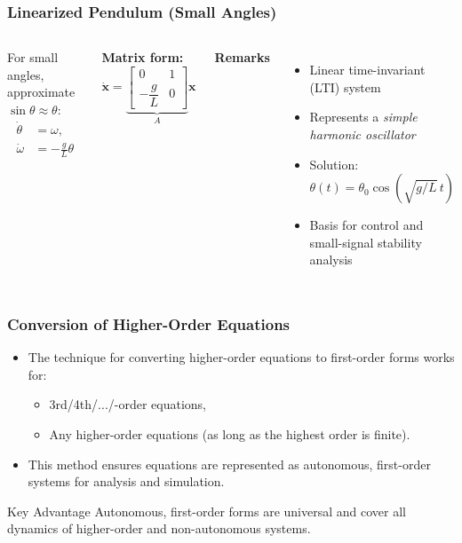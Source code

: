 \documentclass{beamer}
\begin{document}
\begin{frame}
\frametitle{Linearized Pendulum (Small Angles)}
\scriptsize

\begin{columns}[T,onlytextwidth]

  For small angles, approximate \(\sin\theta \approx \theta\):
  \[
    \begin{aligned}
      \dot{\theta} &= \omega,\\[-2pt]
      \dot{\omega} &= -\frac{g}{L}\theta
    \end{aligned}
  \]

  \textbf{Matrix form:}
  \[
    \dot{\mathbf{x}} =
    \underbrace{\begin{bmatrix}
      0 & 1\\[2pt]
      -\dfrac{g}{L} & 0
    \end{bmatrix}}_{A}
    \mathbf{x}
  \]

  \textbf{Remarks}
  \vspace{-4pt}
  \begin{itemize}\itemsep2pt
    \item Linear time-invariant (LTI) system
    \item Represents a \textit{simple harmonic oscillator}
    \item Solution:
      \[
        \theta(t) = \theta_0 \cos(\sqrt{g/L}\,t)
      \]
    \item Basis for control and small-signal stability analysis
  \end{itemize}

\end{columns}
\end{frame}



\begin{frame}
\frametitle{Conversion of Higher-Order Equations}

\begin{itemize}
    \item The technique for converting higher-order equations to first-order forms works for:
    \begin{itemize}
        \item 3rd/4th/.../-order equations,
        \item Any higher-order equations (as long as the highest order is finite).
    \end{itemize}
    \item This method ensures equations are represented as autonomous, first-order systems for analysis and simulation.
\end{itemize}

\begin{block}{Key Advantage}
Autonomous, first-order forms are universal and cover all dynamics of higher-order and non-autonomous systems.
\end{block}

\end{frame}
\end{document}

